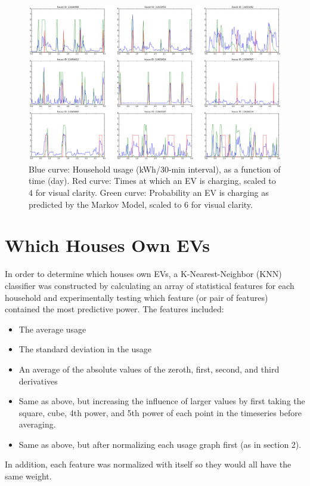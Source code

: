 \documentclass[12pt]{extarticle}
\begin{document}
\begin{figure}
\centering
\includegraphics[width=15cm]{markov}
\caption{
Blue curve: Household usage (kWh/30-min interval), as a function of time (day).
Red curve: Times at which an EV is charging, scaled to 4 for visual clarity. 
Green curve: Probability an EV is charging as predicted by the Markov Model, scaled to 6 for visual clarity.
}
\label{fig:markov}
\end{figure}

\section{Which Houses Own EVs}
In order to determine which houses own EVs, a K-Nearest-Neighbor (KNN) classifier was constructed by calculating an array of statistical features for each household and experimentally testing which feature (or pair of features) contained the most predictive power.
The features included:
\begin{itemize}
	\item The average usage
	\item The standard deviation in the usage
	\item An average of the absolute values of the zeroth, first, second, and third derivatives
	\item Same as above, but increasing the influence of larger values by first taking the square, cube, 4th power, and 5th power of each point in the timeseries before averaging.
	\item Same as above, but after normalizing each usage graph first (as in section 2).
\end{itemize}
In addition, each feature was normalized with itself so they would all have the same weight.
\end{document}
